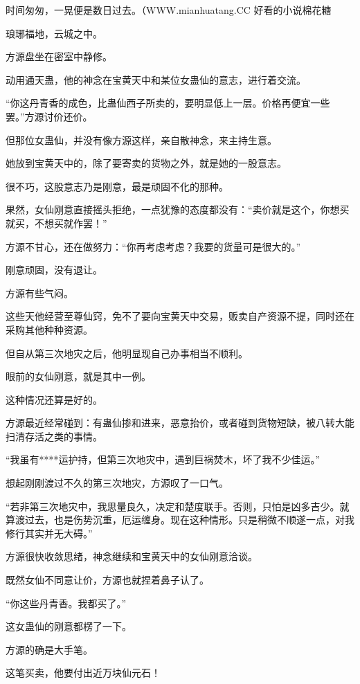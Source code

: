 
\begin{this_body}

时间匆匆，一晃便是数日过去。（WWW.mianhuatang.CC 好看的小说棉花糖

琅琊福地，云城之中。

方源盘坐在密室中静修。

动用通天蛊，他的神念在宝黄天中和某位女蛊仙的意志，进行着交流。

“你这丹青香的成色，比蛊仙西子所卖的，要明显低上一层。价格再便宜一些罢。”方源讨价还价。

但那位女蛊仙，并没有像方源这样，亲自散神念，来主持生意。

她放到宝黄天中的，除了要寄卖的货物之外，就是她的一股意志。

很不巧，这股意志乃是刚意，最是顽固不化的那种。

果然，女仙刚意直接摇头拒绝，一点犹豫的态度都没有：“卖价就是这个，你想买就买，不想买就作罢！”

方源不甘心，还在做努力：“你再考虑考虑？我要的货量可是很大的。”

刚意顽固，没有退让。

方源有些气闷。

这些天他经营至尊仙窍，免不了要向宝黄天中交易，贩卖自产资源不提，同时还在采购其他种种资源。

但自从第三次地灾之后，他明显现自己办事相当不顺利。

眼前的女仙刚意，就是其中一例。

这种情况还算是好的。

方源最近经常碰到：有蛊仙掺和进来，恶意抬价，或者碰到货物短缺，被八转大能扫清存活之类的事情。

“我虽有****运护持，但第三次地灾中，遇到巨祸焚木，坏了我不少佳运。”

想起刚刚渡过不久的第三次地灾，方源叹了一口气。

“若非第三次地灾中，我思量良久，决定和楚度联手。否则，只怕是凶多吉少。就算渡过去，也是伤势沉重，厄运缠身。现在这种情形。只是稍微不顺遂一点，对我修行其实并无大碍。”

方源很快收敛思绪，神念继续和宝黄天中的女仙刚意洽谈。

既然女仙不同意让价，方源也就捏着鼻子认了。

“你这些丹青香。我都买了。”

这女蛊仙的刚意都楞了一下。

方源的确是大手笔。

这笔买卖，他要付出近万块仙元石！


\end{this_body}
